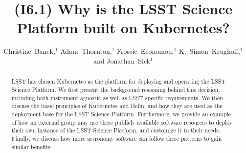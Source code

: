 \documentclass[11pt,twoside]{article}
\begin{document}
\title{(I6.1) Why is the LSST Science Platform built on Kubernetes?}


\author{Christine~Banek,$^1$ Adam~Thornton,$^1$ Frossie~Economou,$^1$ K.~Simon~Krughoff,$^1$ and Jonathan~Sick$^1$}





\newcommand{\code}[1]{\texttt{#1}}

\begin{abstract}
LSST has chosen Kubernetes as the platform for deploying and
operating the LSST Science Platform.  We first present the
background reasoning behind this decision, including both
instrument-agnostic as well as LSST-specific requirements.
We then discuss the basic principles of Kubernetes and Helm, and how
they are used as the deployment base for the LSST Science Platform.
Furthermore, we provide an example of how an external group may
use these publicly available software resources to deploy their own
instance of the LSST Science Platform, and customize it
to their needs.  Finally, we discuss how more astronomy software
can follow these patterns to gain similar benefits.
\end{abstract}
\end{document}
